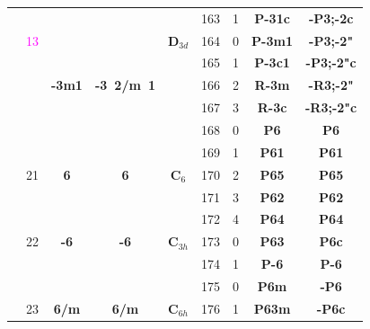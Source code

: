 \documentclass{article}      %
\begin{document}
\begin{small}
\begin{longtable}[c]{|c|c|c|c|c|c|c|c|c|}
 & & & & &\textrm{163}  &\textrm{1} &\textbf{P-31c}       &\textbf{-P3;-2c}\\\cline{3-4}\cline{6-9}       
 &\textrm{\textcolor{magenta}{13}}  & & &$\mathbf{D}_{3d}$ &\textrm{164}  &\textrm{0} &\textbf{P-3m1}       &\textbf{-P3;-2"}\\\cline{6-9}       
 & & & & &\textrm{165}  &\textrm{1} &\textbf{P-3c1}       &\textbf{-P3;-2"c}\\\cline{6-9} 
 & &\textbf{-3m1} &\textbf{-3~2/m~1} & &\textrm{166} & \textrm{2} &\textbf{R-3m}    &\textbf{-R3;-2"}\\\cline{6-9}
 & & & & &\textrm{167} & \textrm{3} &\textbf{R-3c}         &\textbf{-R3;-2"c}\\\hline   
          & & & & &\textrm{168}  &\textrm{0} &\textbf{P6}         &\textbf{P6}\\\cline{6-9}             
          & & & & &\textrm{169}  &\textrm{1} &\textbf{P61}         &\textbf{P61}\\\cline{6-9}           
          &\textrm{21} &\textbf{6} &\textbf{6}  &$\mathbf{C}_6$ &\textrm{170}  &\textrm{2} &\textbf{P65}         &\textbf{P65}\\\cline{6-9}           
	  & & & & &\textrm{171} &\textrm{3} &\textbf{P62}  &\textbf{P62}\\\cline{6-9}           
          & & & & &\textrm{172} &\textrm{4} &\textbf{P64}         &\textbf{P64}\\\cline{2-9}           
 & \textrm{22} &\textbf{-6} &\textbf{-6} &$\mathbf{C}_{3h}$ &\textrm{173}  &\textrm{0} &\textbf{P63}         &\textbf{P6c}\\\cline{6-9}           
          & & & & &\textrm{174}  &\textrm{1} &\textbf{P-6}         &\textbf{P-6}\\\cline{2-9}           
          & & & & &\textrm{175}  &\textrm{0} &\textbf{P6m}         &\textbf{-P6}\\\cline{6-9}           
  & \textrm{23} &\textbf{6/m} &\textbf{6/m} &$\mathbf{C}_{6h}$ &\textrm{176}  &\textrm{1} &\textbf{P63m}         &\textbf{-P6c}\\\cline{2-9}         

\end{longtable}
\end{small}
\end{document}
